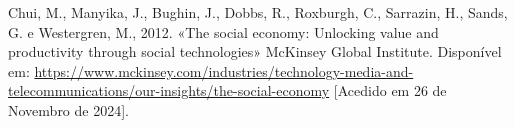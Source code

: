 

\renewcommand\bibname{Referências}

\begin{thebibliography}{9}
    
        Chui, M., Manyika, J., Bughin, J., Dobbs, R., Roxburgh, C., Sarrazin, H., Sands, G. e Westergren, M., 2012. «The social economy: Unlocking value and productivity through social technologies» McKinsey Global Institute. Disponível em: \url{https://www.mckinsey.com/industries/technology-media-and-telecommunications/our-insights/the-social-economy} [Acedido em 26 de Novembro de 2024].
        
\end{thebibliography}



